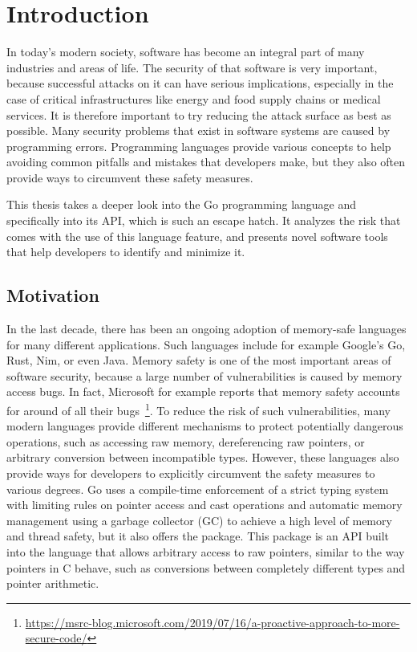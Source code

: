 
\chapter{Introduction}\label{ch:introduction}

In today's modern society, software has become an integral part of many industries and areas of life.
The security of that software is very important, because successful attacks on it can have serious implications,
especially in the case of critical infrastructures like energy and food supply chains or medical services.
It is therefore important to try reducing the attack surface as best as possible.
Many security problems that exist in software systems are caused by programming errors.
Programming languages provide various concepts to help avoiding common pitfalls and mistakes that developers make, but
they also often provide ways to circumvent these safety measures.

This thesis takes a deeper look into the Go programming language and specifically into its \unsafe{} \acrshort{API},
which is such an escape hatch.
It analyzes the risk that comes with the use of this language feature, and presents novel software tools that help
developers to identify and minimize it.



\section{Motivation}\label{sec:introduction:motivation}

In the last decade, there has been an ongoing adoption of memory-safe languages for many different applications.
Such languages include for example Google's Go, Rust, Nim, or even Java.
Memory safety is one of the most important areas of software security, because a large number of vulnerabilities is
caused by memory access bugs.
In fact, Microsoft for example reports that memory safety accounts for around  of all their
bugs~\footnote{\scriptsize\url{https://msrc-blog.microsoft.com/2019/07/16/a-proactive-approach-to-more-secure-code/}}.
To reduce the risk of such vulnerabilities, many modern languages provide different mechanisms to protect potentially
dangerous operations, such as accessing raw memory, dereferencing raw pointers, or arbitrary conversion between
incompatible types.
However, these languages also provide ways for developers to explicitly circumvent the safety measures to various
degrees.
Go uses a compile-time enforcement of a strict typing system with limiting rules on pointer access and cast operations
and automatic memory management using a garbage collector (\acrshort{GC}) to achieve a high level of memory and thread
safety, but it also offers the \unsafe{} package.
This package is an \acrshort{API} built into the language that allows arbitrary access to raw pointers, similar to the
way pointers in C behave, such as conversions between completely different types and pointer arithmetic.

